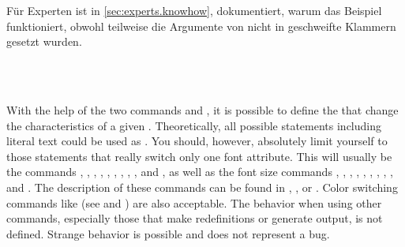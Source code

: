 \else %
F\"ur Experten ist in \autoref{sec:experts.knowhow},
 dokumentiert, warum das Beispiel
funktioniert, obwohl teilweise die Argumente von  nicht in
geschweifte Klammern gesetzt wurden.%
\fi
\fi%
%
%
%


\begin{Declaration}
  \\
  \\
\end{Declaration}%
%
%
%
With the help of the two commands  and
, it is possible to define the  that
change the characteristics of a given . Theoretically, all
possible statements including literal text could be used as .
You should, however, absolutely limit yourself to those
statements that really switch only one font attribute. This will usually be
the commands , , ,
, , , ,
, , and , as well as the font
size commands , , , ,
, , , ,
, and . The description of these commands can be
found in \cite{lshort}, \cite{latex:usrguide}, or \cite{latex:fntguide}. Color
switching commands like  (see \cite{package:graphics} and
\cite{package:xcolor}) are also acceptable.  The behavior when using other
commands, especially those that make redefinitions or generate output, is not
defined. Strange behavior is possible and does not represent a bug.


